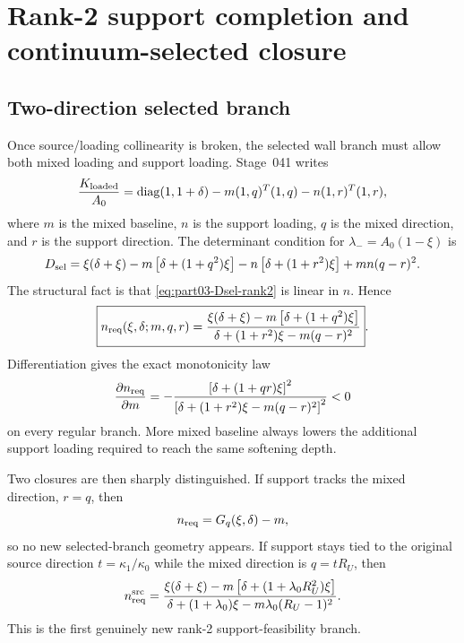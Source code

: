 \section{Rank-2 support completion and continuum-selected closure}
\label{sec:part03_support_family1:rank-2-support-completion}

\subsection{Two-direction selected branch}
\label{subsec:part03-rank2-determinant}

Once source/loading collinearity is broken, the selected wall branch must allow both mixed loading and support loading.  Stage~041 writes
\begin{equation}
\label{eq:part03-rank2-matrix}
\frac{K_{\rm loaded}}{A_0}
=\operatorname{diag}(1,1+\delta)
-m(1,q)^T(1,q)
-n(1,r)^T(1,r),
\end{equation}
where \(m\) is the mixed baseline, \(n\) is the support loading, \(q\) is the mixed direction, and \(r\) is the support direction.  The determinant condition for \(\lambda_-=A_0(1-\xi)\) is
\begin{equation}
\label{eq:part03-Dsel-rank2}
D_{\rm sel}
=\xi(\delta+\xi)
-m\left[\delta+(1+q^2)\xi\right]
-n\left[\delta+(1+r^2)\xi\right]
+mn(q-r)^2.
\end{equation}
The structural fact is that \eqref{eq:part03-Dsel-rank2} is linear in \(n\).  Hence
\begin{equation}
\label{eq:part03-nreq}
\boxed{
 n_{\rm req}(\xi,\delta;m,q,r)
=\frac{\xi(\delta+\xi)-m\left[\delta+(1+q^2)\xi\right]}
{\delta+(1+r^2)\xi-m(q-r)^2}}.
\end{equation}
Differentiation gives the exact monotonicity law
\begin{equation}
\label{eq:part03-nreq-monotone}
\frac{\partial n_{\rm req}}{\partial m}
=-\frac{\left[\delta+(1+qr)\xi\right]^2}
{\left[\delta+(1+r^2)\xi-m(q-r)^2\right]^2}<0
\end{equation}
on every regular branch.  More mixed baseline always lowers the additional support loading required to reach the same softening depth.

Two closures are then sharply distinguished.  If support tracks the mixed direction, \(r=q\), then
\begin{equation}
\label{eq:part03-tracking-rank2}
n_{\rm req}=G_q(\xi,
\delta)-m,
\end{equation}
so no new selected-branch geometry appears.  If support stays tied to the original source direction \(t=\kappa_1/\kappa_0\) while the mixed direction is \(q=tR_U\), then
\begin{equation}
\label{eq:part03-source-tied-nreq}
 n_{\rm req}^{\rm src}
=\frac{\xi(\delta+\xi)-m\left[\delta+(1+\lambda_0R_U^2)\xi\right]}
{\delta+(1+\lambda_0)\xi-m\lambda_0(R_U-1)^2}.
\end{equation}
This is the first genuinely new rank-2 support-feasibility branch.

